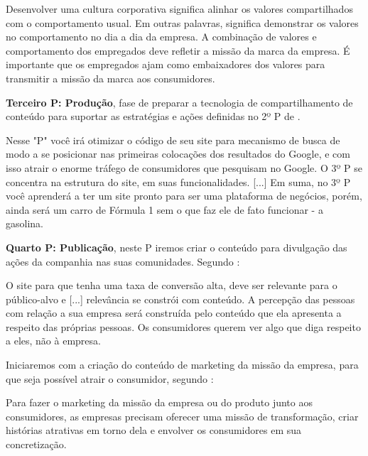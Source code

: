 \begin{citacao}
Desenvolver uma cultura corporativa significa alinhar os valores compartilhados com o comportamento usual. Em outras palavras, significa demonstrar os valores no comportamento no dia a dia da empresa. A combinação de valores e comportamento dos empregados deve refletir a missão da marca da empresa. É importante que os empregados ajam como embaixadores dos valores para transmitir a missão da marca aos consumidores.
\end{citacao}

\textbf{Terceiro P: Produção}, fase de preparar a tecnologia de compartilhamento de conteúdo para suportar as estratégias e ações definidas no 2º P de .

\begin{citacao}
Nesse "P" você irá otimizar o código de seu site para mecanismo de busca de modo a se posicionar nas primeiras colocações dos resultados do Google, e com isso
atrair o enorme tráfego de consumidores que pesquisam no Google. O 3º P se concentra na estrutura do site, em suas funcionalidades. [...] Em suma, no 3º P você aprenderá a ter um site pronto para ser uma plataforma de negócios, porém, ainda será um carro de Fórmula 1 sem o que faz ele de fato
funcionar - a gasolina.
\end{citacao}

\textbf{Quarto P: Publicação}, neste P iremos criar o conteúdo para divulgação das ações da companhia nas suas comunidades. Segundo :

\begin{citacao}
O site para que tenha uma taxa de conversão alta, deve ser relevante para o público-alvo e [...] relevância se constrói com conteúdo. A percepção
das pessoas com relação a sua empresa será construída pelo conteúdo que ela apresenta a respeito das próprias pessoas. Os consumidores querem ver algo que diga respeito a eles, não à empresa.
\end{citacao}

Iniciaremos com a criação do conteúdo de marketing da missão da empresa, para que seja possível atrair o consumidor, segundo :

\begin{citacao}
Para fazer o marketing da missão da empresa ou do produto junto aos consumidores, as empresas precisam oferecer uma missão de transformação, criar histórias atrativas em torno dela e envolver os consumidores em sua concretização.
\end{citacao}

